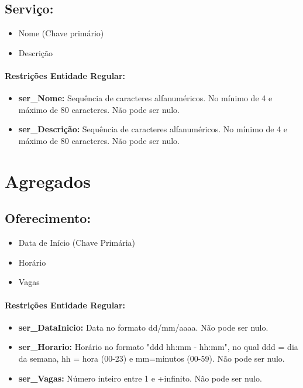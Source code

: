 \documentclass{report}
\begin{document}
\subsection{Serviço:}
\begin{itemize}
  \item Nome (Chave primário)
  \item Descrição
\end{itemize}
\paragraph{Restrições Entidade Regular:}
\begin{itemize}
  \item \textbf{ser\_Nome:} Sequência de caracteres alfanuméricos. No mínimo de 4 e máximo de 80 caracteres. Não pode ser nulo.
    \item \textbf{ser\_Descrição:} Sequência de caracteres alfanuméricos. No mínimo de 4 e máximo de 80 caracteres. Não pode ser nulo.

\end{itemize}

\section{Agregados}

\subsection{Oferecimento:}
\begin{itemize}
  \item Data de Início (Chave Primária)
  \item Horário
  \item Vagas
\end{itemize}

\paragraph{Restrições Entidade Regular:}
\begin{itemize}
  \item \textbf{ser\_DataInicio:} Data no formato dd/mm/aaaa. Não pode ser nulo.
  \item \textbf{ser\_Horario:} Horário no formato "ddd hh:mm - hh:mm", no qual ddd = dia da semana, hh = hora (00-23) e mm=minutos (00-59). Não pode ser nulo.
  \item \textbf{ser\_Vagas:} Número inteiro entre 1 e +infinito. Não pode ser nulo.
\end{itemize}
\end{document}
